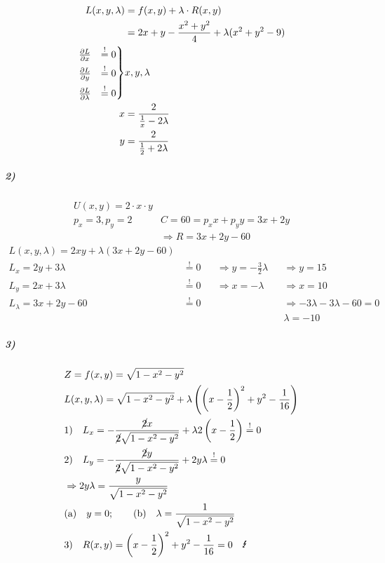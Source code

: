 \begin{align*}
    L(x, y, \lambda) &= f(x, y) + \lambda \cdot R(x, y) \\
    &= 2x + y - \frac{x^2 + y^2}{4} + \lambda(x^2 + y^2 - 9) \\
    \begin{rcases}
        \frac{\partial L}{\partial x} &\overset{!}{=} 0 \\
        \frac{\partial L}{\partial y} &\overset{!}{=} 0 \\
        \frac{\partial L}{\partial \lambda} &\overset{!}{=} 0
    \end{rcases}
    &x, y, \lambda \\
    x &= \frac{2}{\frac{1}{x} - 2 \lambda} \\
    y &= \frac{2}{\frac{1}{2} + 2 \lambda}
\end{align*}

\subparagraph{2)}

\begin{align*}
    U(x, y) = 2 \cdot x \cdot y \\
    p_x = 3, p_y = 2 \qquad &C = 60 = p_x x + p_y y = 3x + 2y \\
    &\Rightarrow R = 3x + 2y - 60
\end{align*}
\begin{align*}
    L(x, y, \lambda) = 2xy + \lambda (3x + 2y - 60) \\
    L_x = 2 y + 3 \lambda &\overset{!}{=} 0 &&\Rightarrow y = - \frac{3}{2} \lambda &&\Rightarrow y = 15 \\
    L_y = 2 x + 3 \lambda &\overset{!}{=} 0 &&\Rightarrow x = - \lambda  &&\Rightarrow x = 10 \\
    L_\lambda = 3 x + 2 y - 60 &\overset{!}{=} 0 && &&\Rightarrow - 3 \lambda - 3 \lambda - 60 = 0 \\
    & && &&\lambda = -10
\end{align*}


\subparagraph{3)}

\begin{align*}
    & Z = f(x, y) = \sqrt{1 - x^2 - y^2} \\
    & L(x, y, \lambda) = \sqrt{1 - x^2 - y^2} + \lambda \left( {\left( x - \frac{1}{2} \right)}^2 + y^2 - \frac{1}{16} \right) \\
    &1)\quad L_x = - \frac{\cancel{2} x}{\cancel{2} \sqrt{1 - x^2 - y^2}} + \lambda 2 \left( x - \frac{1}{2} \right) \overset{!}{=} 0 \\
    &2)\quad L_y = - \frac{\cancel{2} y}{\cancel{2} \sqrt{1 - x^2 - y^2}} + 2 y \lambda \overset{!}{=} 0 \\
    & \Rightarrow 2 y \lambda = \frac{y}{\sqrt{1 - x^2 - y^2}} \\
    & \text{(a)} \quad y = 0;\qquad \text{(b)} \quad \lambda = \frac{1}{\sqrt{1 - x^2 - y^2}} \\
    &3)\quad R(x, y) = {\left( x - \frac{1}{2} \right)}^2 + y^2 - \frac{1}{16} = 0 \quad \text{\Lightning}
\end{align*}


